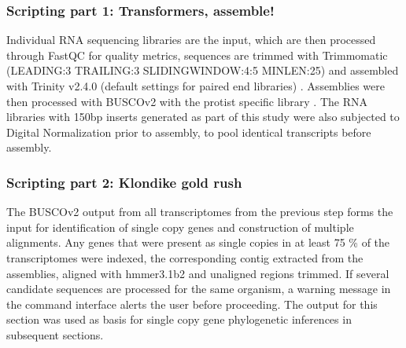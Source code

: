 \documentclass[12pt]{article}
\begin{document}
\subsubsection*{Scripting part 1: Transformers, assemble!}
Individual RNA sequencing libraries are the input, which are then processed through FastQC \cite{fastqc} for quality metrics, sequences are trimmed with Trimmomatic (LEADING:3 TRAILING:3 SLIDINGWINDOW:4:5 MINLEN:25) \cite{bolger2014trimmomatic} and assembled with Trinity v2.4.0 (default settings for paired end libraries) \cite{haas2013novo}. 
Assemblies were then processed with BUSCOv2 with the protist specific library \cite{simao2015busco}.
The RNA libraries with 150bp inserts generated as part of this study were also subjected to Digital Normalization \cite{diginorm} prior to assembly, to pool identical transcripts before assembly.                                                                                                                                                                                                                                                                                                                                                                                                                                                                                                                                                                                                                                                                                                                                                                                                                                                                                                                                                                                                                                                                                                                                                                                                                                                                                                         %
\subsubsection*{Scripting part 2: Klondike gold rush}
The BUSCOv2 output from all transcriptomes from the previous step forms the input for identification of single copy genes and construction of multiple alignments. 
Any genes that were present as single copies in at least 75 \% of the transcriptomes were indexed, the corresponding contig extracted from the assemblies, aligned with hmmer3.1b2 \cite{eddy2015hmmer} and unaligned regions trimmed.
If several candidate sequences are processed for the same organism, a warning message in the command interface alerts the user before proceeding. 
The output for this section was used as basis for single copy gene phylogenetic inferences in subsequent sections.
\end{document}
